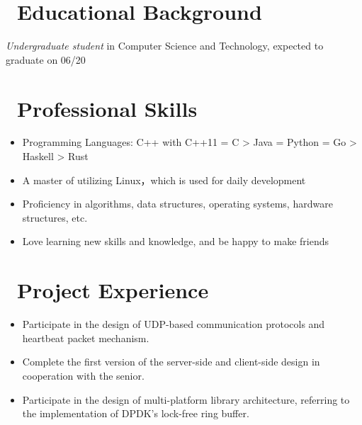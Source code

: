 \documentclass{resume}
\begin{document}



\section{\texorpdfstring{\faGraduationCap\ Educational Background}{Educational Background}}
\textit{Undergraduate student} in Computer Science and Technology, expected to graduate on 06/20

\section{\texorpdfstring{\faCogs\ Professional Skills}{Professional Skills}}
\begin{itemize}[parsep=0.5ex]
  \item Programming Languages: C++ with C++11 = C > Java = Python = Go > Haskell > Rust
  \item A master of utilizing Linux，which is used for daily development
  \item Proficiency in algorithms, data structures, operating systems, hardware structures, etc.
  \item Love learning new skills and knowledge, and be happy to make friends
\end{itemize}

\section{\texorpdfstring{\faUsers\ Project Experience}{Project Experience}}
\begin{itemize}
  \item Participate in the design of UDP-based communication protocols and heartbeat packet mechanism.
  \item Complete the first version of the server-side and client-side design in cooperation with the senior.
  \item Participate in the design of multi-platform library architecture, referring to the implementation of DPDK's lock-free ring buffer.
\end{itemize}
\end{document}
